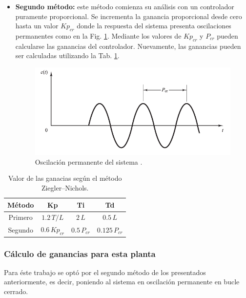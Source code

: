 \begin{itemize}
 \item \textbf{Segundo método:}
 este método comienza su análisis con un controlador puramente proporcional.
 Se incrementa  la ganancia proporcional desde cero hasta un valor $Kp_{cr} $
donde la respuesta del  sistema presenta oscilaciones permanentes como en la
Fig. \ref{fig:segundometodo}.
 Mediante los valores de $Kp_{cr} $ y $P_{cr}$ pueden calcularse las ganancias
del controlador.
Nuevamente, las ganancias pueden ser calculadas utilizando la Tab.
\ref{tab:valorganancias}.
\begin{figure}[ht]
 \centering
 \includegraphics[scale=0.5]{Cap4-ProgramacionPLC/images/segundometodo.png}
 \caption{Oscilación permanente del sistema \cite{bib:Ogata}.}
 \label{fig:segundometodo}
\end{figure}
\end{itemize}

\begin{table}[!t]
\renewcommand{\arraystretch}{1.3}
\centering
\begin{tabular}{c||c||c |c}
\hline
\bfseries Método & \bfseries Kp  & \bfseries Ti & \bfseries Td\\
\hline \hline
Primero &  $ 1.2 \, {T}/{L}$ & $2 \, L $ & $ 0.5 \, L $\\
\hline
Segundo &  $0.6 \,Kp_{cr}  $ & $ 0.5 \, P_{cr}$ & $0.125 \, P_{cr} $\\
\hline
\end{tabular}
\caption{Valor de las ganacias según el método Ziegler–Nichols.}
\label{tab:valorganancias}
\end{table}

\subsubsection{Cálculo de ganancias para esta planta}

Para éste trabajo se optó por el segundo método de los presentados
anteriormente, es decir, poniendo al sistema en oscilación permanente en bucle
cerrado.

